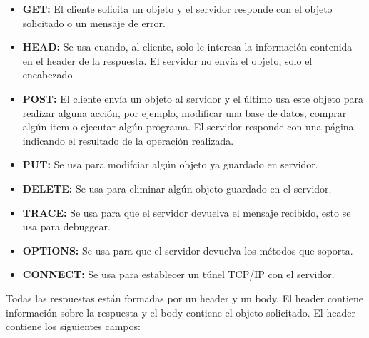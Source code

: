 \begin{itemize}
  \item \textbf{GET:} El cliente solicita un objeto y el servidor responde con el objeto solicitado o un mensaje de error.
  \item \textbf{HEAD:} Se usa cuando, al cliente, solo le interesa la información contenida en el header de la respuesta. El servidor no envía el objeto, solo el encabezado.
  \item \textbf{POST:} El cliente envía un objeto al servidor y el último usa este objeto para realizar alguna acción, por ejemplo, modificar una base de datos, comprar algún item o ejecutar algún programa. El servidor responde con una página indicando el resultado de la operación realizada.
  \item \textbf{PUT:} Se usa para modifciar algún objeto ya guardado en servidor.
  \item \textbf{DELETE:} Se usa para eliminar algún objeto guardado en el servidor.
  \item \textbf{TRACE:} Se usa para que el servidor devuelva el mensaje recibido, esto se usa para debuggear.
  \item \textbf{OPTIONS:} Se usa para que el servidor devuelva los métodos que soporta.
  \item \textbf{CONNECT:} Se usa para establecer un túnel TCP/IP con el servidor.
\end{itemize}

Todas las respuestas están formadas por un header y un body. El header contiene información sobre la respuesta y el body contiene el objeto solicitado. El header contiene los siguientes campos:

